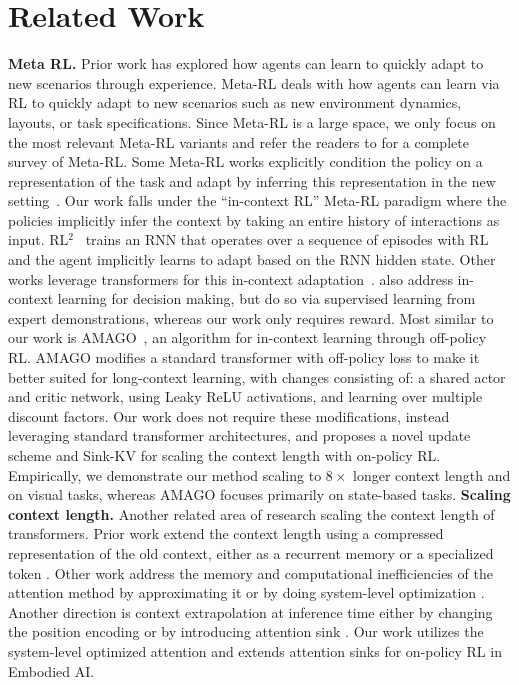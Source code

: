 \documentclass{article}
\newcommand{\rls}{RL$^{2}$\xspace}
\newcommand{\sinkv}{Sink-KV\xspace}
\begin{document}
\section{Related Work}
\textbf{Meta RL.} Prior work has explored how agents can learn to quickly adapt to new scenarios through experience.
Meta-RL deals with how agents can learn via RL to quickly adapt to new scenarios such as new environment dynamics, layouts, or task specifications.
Since Meta-RL is a large space, we only focus on the most relevant Meta-RL variants and refer the readers to \citet{beck2023survey} for a complete survey of Meta-RL.
Some Meta-RL works explicitly condition the policy on a representation of the task and adapt by inferring this representation in the new setting~\citep{zhao2020meld,yu2020learning,rakelly2019efficient}.
Our work falls under the ``in-context RL'' Meta-RL paradigm where the policies implicitly infer the context by taking an entire history of interactions as input.
\rls~\cite{duan2016rl} trains an RNN that operates over a sequence of episodes with RL and the agent implicitly learns to adapt based on the RNN hidden state.
Other works leverage transformers for this in-context adaptation~\citep{team2023human,melo2022transformers,laskin2022context}.
\cite{raparthy2023generalizationnewsequentialdecision,lee2023supervisedpretraininglearnincontext} also address in-context learning for decision making, but do so via supervised learning from expert demonstrations, whereas our work only requires reward.
Most similar to our work is AMAGO~\citep{grigsby2023amago}, an algorithm for in-context learning through off-policy RL.
AMAGO modifies a standard transformer with off-policy loss to make it better suited for long-context learning, with changes consisting of: a shared actor and critic network, using Leaky ReLU activations, and learning over multiple discount factors.
Our work does not require these modifications, instead leveraging standard transformer architectures, and proposes a novel update scheme and \sinkv for scaling the context length with on-policy RL.
Empirically, we demonstrate our method scaling to $8\times$ longer context length and on visual tasks, whereas AMAGO focuses primarily on state-based tasks.
\textbf{Scaling context length.}
Another related area of research scaling the context length of transformers.
Prior work extend the context length using a compressed representation of the old context, either as a recurrent memory or a specialized token \citep{dai2019transformerxl,munkhdalai2024leave,zhang2024soaring}.
Other work address the memory and computational inefficiencies of the attention method by approximating it \citep{beltagy2020longformer,wang2020linformer} or by doing system-level optimization \citep{dao2023flashattention2}. Another direction is context extrapolation at inference time either by changing the position encoding \citep{su2023roformer,press2022train} or by introducing attention sink \citep{xiao2023efficient}. Our work utilizes the system-level optimized attention \citep{dao2023flashattention2} and extends attention sinks for on-policy RL in Embodied AI.
\end{document}
